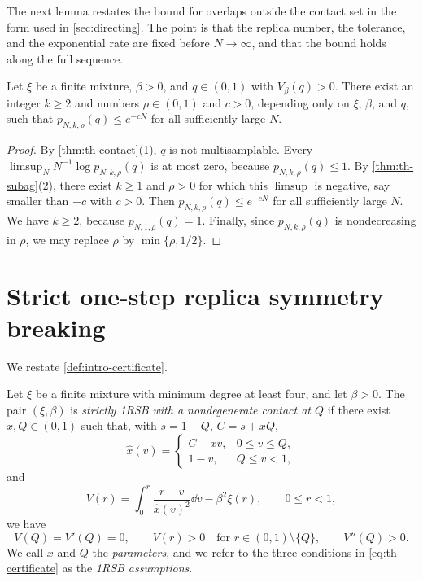 The next lemma restates the bound for overlaps outside the contact set in the form used in \cref{sec:directing}. The point is that the replica number, the tolerance, and the exponential rate are fixed before $N\to\infty$, and that the bound holds along the full sequence.

\begin{lemma}\label{lem:th-replica-exclusion}
Let $\xi$ be a finite mixture, $\beta>0$, and $q\in(0,1)$ with $V_\beta(q)>0$. There exist an integer $k\ge2$ and numbers $\rho\in(0,1)$ and $c>0$, depending only on $\xi$, $\beta$, and $q$, such that $p_{N,k,\rho}(q)\le e^{-cN}$ for all sufficiently large $N$.
\end{lemma}

\begin{proof}
By \cref{thm:th-contact}(1), $q$ is not multisamplable. Every $\limsup_NN^{-1}\log p_{N,k,\rho}(q)$ is at most zero, because $p_{N,k,\rho}(q)\le1$. By \cref{thm:th-subag}(2), there exist $k\ge1$ and $\rho>0$ for which this $\limsup$ is negative, say smaller than $-c$ with $c>0$. Then $p_{N,k,\rho}(q)\le e^{-cN}$ for all sufficiently large $N$. We have $k\ge2$, because $p_{N,1,\rho}(q)=1$. Finally, since $p_{N,k,\rho}(q)$ is nondecreasing in $\rho$, we may replace $\rho$ by $\min\{\rho,1/2\}$.
\end{proof}

\section{Strict one-step replica symmetry breaking}\label{sec:th-certificate}

We restate \cref{def:intro-certificate}.

\begin{definition}\label{def:th-certificate}
Let $\xi$ be a finite mixture with minimum degree at least four, and let $\beta>0$. The pair $(\xi,\beta)$ is \emph{strictly 1RSB with a nondegenerate contact at $Q$} if there exist $x,Q\in(0,1)$ such that, with $s=1-Q$, $C=s+xQ$,
\begin{equation}\label{eq:th-xhat}
\hat x(v)=\begin{cases}C-xv,&0\le v\le Q,\\1-v,&Q\le v<1,\end{cases}
\end{equation}
and
\[
V(r)=\int_0^r\frac{r-v}{\hat x(v)^2}\dd v-\beta^2\xi(r),\qquad 0\le r<1,
\]
we have
\begin{equation}\label{eq:th-certificate}
V(Q)=V'(Q)=0,\qquad V(r)>0\quad\text{for }r\in(0,1)\setminus\{Q\},\qquad V''(Q)>0.
\end{equation}
We call $x$ and $Q$ the \emph{parameters}, and we refer to the three conditions in \eqref{eq:th-certificate} as the \emph{1RSB assumptions}.
\end{definition}

